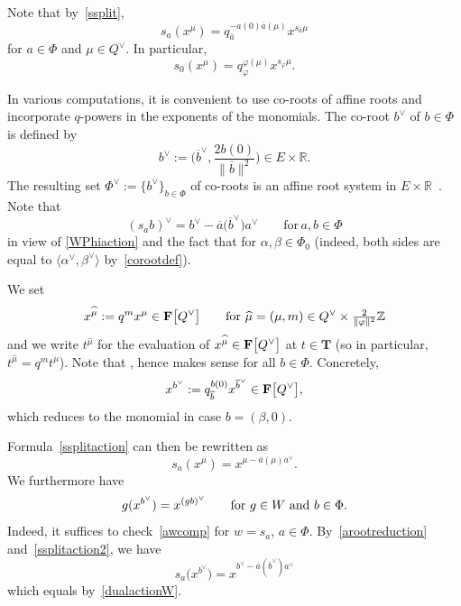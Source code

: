Note that by~\eqref{ssplit},
\begin{equation}\label{ssplitaction}
s_a(x^\mu)=q_{\overline{a}}^{-a(0)\overline{a}(\mu)}x^{s_{\overline{a}}\mu}
\end{equation}
for $a\in\Phi$ and $\mu\in Q^\vee$. In particular,
\begin{equation*}%
s_0(x^\mu)=q_\varphi^{\varphi(\mu)}x^{s_\varphi\mu}.
\end{equation*}

In various computations, it is convenient to use co-roots of affine roots and incorporate $q$-powers in the exponents of the monomials. The co-root $b^\vee$ of $b\in\Phi$ is defined by
\[
b^\vee:=\biggl(\overline{b}^\vee,\frac{2b(0)}{\|\overline{b}\|^2}\biggr)\in E\times\mathbb{R}.
\]
The resulting set $\Phi^\vee:=\{b^\vee\}_{b\in\Phi}$ of co-roots is an affine root system in $E\times\mathbb{R}$~\cite{MacAff}. Note that
\begin{equation}\label{dualactionW}
(s_ab)^\vee=b^\vee-\overline{a}\bigl(\overline{b}^\vee\bigr)a^\vee\qquad \text{for}\, a,b\in\Phi
\end{equation}
in view of
\eqref{WPhiaction} and the fact that  for $\alpha,\beta\in\Phi_0$ (indeed, both sides are equal to $\langle\alpha^\vee,\beta^\vee\rangle$ by~\eqref{corootdef}).

We set
\[
x^{\widehat{\mu}}:=q^mx^\mu\in\mathbf{F}\smash{\bigl[Q^\vee\bigr]}\qquad\textup{for}\ \widehat{\mu}=(\mu,m)\in Q^\vee\times \tfrac{2}{\|\varphi\|^2}\mathbb{Z}
\]
and we write $t^{\widehat{\mu}}$ for the evaluation of $x^{\widehat{\mu}}\in\mathbf{F}\smash{\bigl[Q^\vee\bigr]}$ at $t\in\mathbf{T}$ \big(so in particular, $t^{\widehat{\mu}}=q^mt^\mu$\big).
Note that , hence  makes sense for all $b\in\Phi$. Concretely,
\begin{equation}\label{arootreduction}
x^{b^\vee}:=q_{\overline{b}}^{b(0)}x^{\overline{b}^\vee}\in\mathbf{F}\smash{\bigl[Q^\vee\bigr]},
\end{equation}
which reduces to the monomial  in case $b=(\beta,0)$.

Formula~\eqref{ssplitaction} can then be rewritten as
\begin{equation}\label{ssplitaction2}
s_a(x^\mu)=x^{\mu-\overline{a}(\mu)a^\vee}.
\end{equation}
We furthermore have
\begin{equation}\label{awcomp}
g(x^{b^\vee})=x^{(gb)^\vee}\qquad \textup{for}\ g\in W\ \text{and}\ b\in\Phi.
\end{equation}
Indeed, it suffices to check~\eqref{awcomp} for $w=s_a$, $a\in\Phi$. By~\eqref{arootreduction} and~\eqref{ssplitaction2}, we have
\[
s_a\bigl(x^{b^\vee}\bigr)=x^{b^\vee-\overline{a}(\overline{b}^\vee)a^\vee}
\]
which equals  by~\eqref{dualactionW}.

